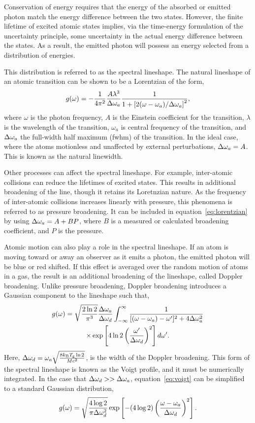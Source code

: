 {Conservation of energy requires that the energy of the absorbed or emitted
photon match the energy difference between the two states. However, the finite
lifetime of excited atomic states implies, via the time-energy formulation of
the uncertainty principle, some uncertainty in the actual energy difference
between the states. As a result, the emitted photon will possess an energy
selected from a distribution of energies.

This distribution is referred to as the spectral lineshape. The natural
lineshape of an atomic transition can be shown \cite{Siegman1986} to be a
Lorentzian of the form,
\begin{equation}
  g(\omega) = -\frac{1}{4\pi^2}\frac{A\lambda^3}{\Delta \omega_a}
  \frac{1}{1 + \left[2(\omega-\omega_a)/\Delta \omega_a\right]^2},
  \label{eq:lorentzian}
\end{equation}
where $\omega$ is the photon frequency, $A$ is the Einstein coefficient for the
transition, $\lambda$ is the wavelength of the transition, $\omega_a$ is central
frequency of the transition, and $\Delta \omega_a$ the full-width half maximum (\acs{fwhm})
of the transition. In the ideal case, where the atoms motionless and unaffected
by external perturbations, $\Delta \omega_a = A$. This is known as the natural linewidth.

Other processes can affect the spectral lineshape. For example, inter-atomic
collisions can reduce the lifetimes of excited states. This results in
additional broadening of the line, though it retains its Loretnzian nature. As
the frequency of inter-atomic collisions increases linearly with pressure, this
phenomena is referred to as pressure broadening. It can be included in
equation~\ref{eq:lorentzian} by using $\Delta \omega_a = A + BP$, where $B$ is a measured
or calculated broadening coefficient, and $P$ is the pressure.

Atomic motion can also play a role in the spectral lineshape. If an atom is
moving toward or away an observer as it emits a photon, the emitted photon will
be blue or red shifted. If this effect is averaged over the random motion of
atoms in a gas, the result is an additional broadening of the lineshape, called
Doppler broadening. Unlike pressure broadening, Doppler broadening introduces a
Gaussian component to the lineshape such that,
\begin{multline}
  g(\omega) = \sqrt{\frac{2\ln{2}}{\pi^3}}\frac{\Delta \omega_a}{\Delta \omega_d}
  \int_{-\infty}^\infty
  \frac{1}{[(\omega - \omega_a) - \omega']^2 + 4\Delta \omega_a^2} \\
  \times \exp\left[4\ln{2}\left(\frac{\omega'}{\Delta \omega_d}\right)^2\right]d\omega'.
  \label{eq:voigt}
\end{multline}
Here, $\Delta \omega_d = \omega_a\sqrt{\frac{8k_\mathrm{B}T_\mathrm{g}\ln{2}} {Mc^2}}$, is
the width of the Doppler broadening. This form of the spectral lineshape is
known as the Voigt profile, and it must be numerically integrated. In the case
that $\Delta \omega_d >> \Delta \omega_a$, equation~\ref{eq:voigt} can be simplified to a standard
Gaussian distribution,
\begin{equation}
  g(\omega) = \sqrt{\frac{4\log{2}}{\pi\Delta \omega_d^2}}
  \exp\left[-(4\log{2})\left(\frac{\omega-\omega_a}{\Delta \omega_d}\right)^2\right].
\end{equation}

}
